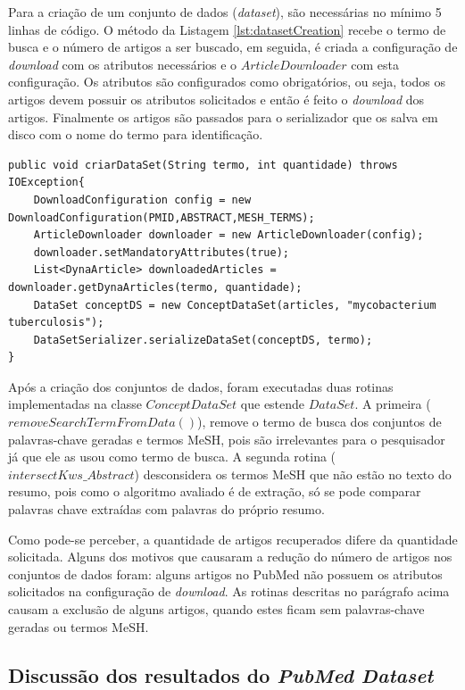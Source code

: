 Para a criação de um conjunto de dados (\emph{dataset}), são necessárias no mínimo 5 linhas de código. O método da Listagem \ref{lst:datasetCreation} recebe o termo de busca e o número de artigos a ser buscado, em seguida, é criada a configuração de \emph{download} com os atributos necessários e o $ArticleDownloader$ com esta configuração. Os atributos são configurados como obrigatórios, ou seja, todos os artigos devem possuir os atributos solicitados e então é feito o \emph{download} dos artigos. Finalmente os artigos são passados para o serializador que os salva em disco com o nome do termo para identificação.

\begin{lstlisting}
public void criarDataSet(String termo, int quantidade) throws IOException{
    DownloadConfiguration config = new DownloadConfiguration(PMID,ABSTRACT,MESH_TERMS);
    ArticleDownloader downloader = new ArticleDownloader(config);
    downloader.setMandatoryAttributes(true);
    List<DynaArticle> downloadedArticles = downloader.getDynaArticles(termo, quantidade);
    DataSet conceptDS = new ConceptDataSet(articles, "mycobacterium tuberculosis");
    DataSetSerializer.serializeDataSet(conceptDS, termo);
}
\end{lstlisting}

Após a criação dos conjuntos de dados, foram executadas duas rotinas implementadas na classe $ConceptDataSet$ que estende $DataSet$. A primeira ($removeSearchTermFromData()$), remove o termo de busca dos conjuntos de palavras-chave geradas e termos MeSH, pois são irrelevantes para o pesquisador já que ele as usou como termo de busca. A segunda rotina ($intersectKws\_Abstract$) desconsidera os termos MeSH que não estão no texto do resumo, pois como o algoritmo avaliado é de extração, só se pode comparar palavras chave extraídas com palavras do próprio resumo.

Como pode-se perceber, a quantidade de artigos recuperados difere da quantidade solicitada. Alguns dos motivos que causaram a redução do número de artigos nos conjuntos de dados foram: alguns artigos no PubMed não possuem os atributos solicitados na configuração de \emph{download}. As rotinas descritas no parágrafo acima causam a exclusão de alguns artigos, quando estes ficam sem palavras-chave geradas ou termos MeSH.

\subsection{Discussão dos resultados do \emph{PubMed Dataset}}

